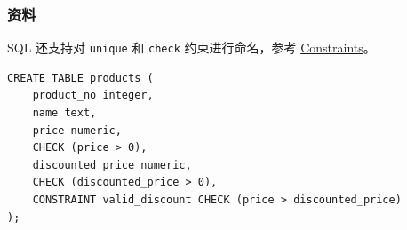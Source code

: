 \documentclass[aspectratio=169, 14pt]{beamer}
\begin{document}
\begin{frame}[fragile]
    \frametitle{资料}
SQL 还支持对 \texttt{unique} 和 \texttt{check} 约束进行命名，参考 \href{https://www.postgresql.org/docs/14/ddl-constraints.html}{Constraints}。

\begin{verbatim}
CREATE TABLE products (
    product_no integer,
    name text,
    price numeric,
    CHECK (price > 0),
    discounted_price numeric,
    CHECK (discounted_price > 0),
    CONSTRAINT valid_discount CHECK (price > discounted_price)
);
\end{verbatim}

\end{frame}
\end{document}
